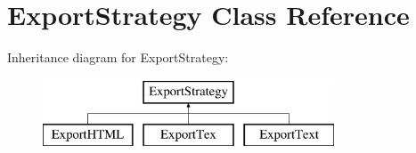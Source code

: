 \hypertarget{class_export_strategy}{\section{Export\-Strategy Class Reference}
\label{class_export_strategy}
}
Inheritance diagram for Export\-Strategy\-:\begin{figure}[H]
\begin{center}
\leavevmode
\includegraphics[height=2.000000cm]{class_export_strategy}
\end{center}
\end{figure}
